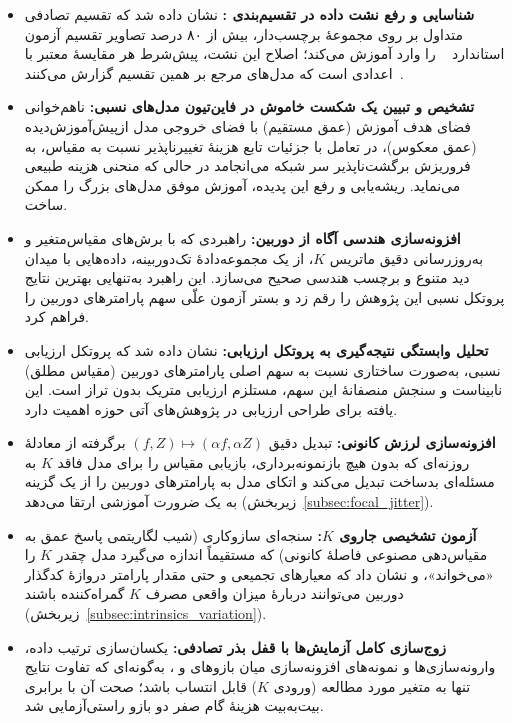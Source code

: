 \begin{itemize}
    \item \textbf{شناسایی و رفع نشت داده در تقسیم‌بندی :}
    نشان داده شد که تقسیم تصادفی متداول بر روی مجموعهٔ برچسب‌دار،
    بیش از ۸۰ درصد تصاویر تقسیم آزمون استاندارد ~\cite{Eigen2014Depth}
    را وارد آموزش می‌کند؛
    اصلاح این نشت، پیش‌شرط هر مقایسهٔ معتبر با اعدادی است که مدل‌های مرجع
    بر همین تقسیم گزارش می‌کنند~\cite{DepthAnythingV2}.

    \item \textbf{تشخیص و تبیین یک شکست خاموش در فاین‌تیون مدل‌های نسبی:}
    ناهم‌خوانی فضای هدف آموزش (عمق مستقیم) با فضای خروجی مدل
    ازپیش‌آموزش‌دیده (عمق معکوس)، در تعامل با جزئیات تابع هزینهٔ
    تغییرناپذیر نسبت به مقیاس، به فروریزش برگشت‌ناپذیر سر شبکه
    می‌انجامد در حالی که منحنی هزینه طبیعی می‌نماید.
    ریشه‌یابی و رفع این پدیده، آموزش موفق مدل‌های بزرگ را ممکن ساخت.

    \item \textbf{افزونه‌سازی هندسی آگاه از دوربین:}
    راهبردی که با برش‌های مقیاس‌متغیر و به‌روزرسانی دقیق ماتریس $K$،
    از یک مجموعه‌دادهٔ تک‌دوربینه، داده‌هایی با میدان دید متنوع و
    برچسب هندسی صحیح می‌سازد. این راهبرد به‌تنهایی
    بهترین نتایج پروتکل نسبی این پژوهش را رقم زد
    و بستر آزمون علّی سهم پارامترهای دوربین را فراهم کرد.

    \item \textbf{تحلیل وابستگی نتیجه‌گیری به پروتکل ارزیابی:}
    نشان داده شد که پروتکل ارزیابی نسبی، به‌صورت ساختاری
    نسبت به سهم اصلی پارامترهای دوربین (مقیاس مطلق) نابیناست
    و سنجش منصفانهٔ این سهم، مستلزم ارزیابی متریک بدون تراز است.
    این یافته برای طراحی ارزیابی در پژوهش‌های آتی حوزه اهمیت دارد.

    \item \textbf{افزونه‌سازی لرزش کانونی:}
    تبدیل دقیق $(f, Z) \mapsto (\alpha f, \alpha Z)$ برگرفته از معادلهٔ
    روزنه‌ای که بدون هیچ بازنمونه‌برداری، بازیابی مقیاس را برای مدل
    فاقد $K$ به مسئله‌ای بدساخت تبدیل می‌کند و اتکای مدل به پارامترهای
    دوربین را از یک گزینه به یک ضرورت آموزشی ارتقا می‌دهد
    (زیربخش~\ref{subsec:focal_jitter}).

    \item \textbf{آزمون تشخیصی جاروی $K$:}
    سنجه‌ای سازوکاری (شیب لگاریتمی پاسخ عمق به مقیاس‌دهی مصنوعی
    فاصلهٔ کانونی) که مستقیماً اندازه می‌گیرد مدل چقدر $K$ را
    «می‌خواند»، و نشان داد که معیارهای تجمیعی و حتی مقدار پارامتر
    دروازهٔ کدگذار دوربین می‌توانند دربارهٔ میزان واقعی مصرف $K$
    گمراه‌کننده باشند (زیربخش~\ref{subsec:intrinsics_variation}).

    \item \textbf{زوج‌سازی کامل آزمایش‌ها با قفل بذر تصادفی:}
    یکسان‌سازی ترتیب داده، وارونه‌سازی‌ها و نمونه‌های افزونه‌سازی
    میان بازوهای \proposedmodel{} و \controlmodel{}، به‌گونه‌ای که تفاوت نتایج تنها به
    متغیر مورد مطالعه (ورودی $K$) قابل انتساب باشد؛ صحت آن با برابری
    بیت‌به‌بیت هزینهٔ گام صفر دو بازو راستی‌آزمایی شد.
\end{itemize}




